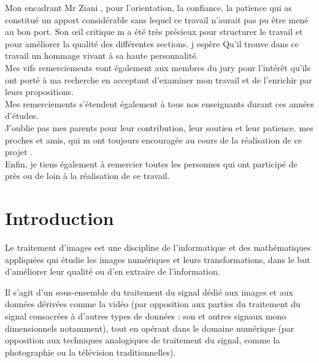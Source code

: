 \documentclass[a4paper,12pt]{report}
\begin{document}
Mon encadrant Mr Ziani , pour l’orientation, la confiance, la patience qui as constitué un apport considérable sans lequel ce travail n’aurait pas pu être mené au bon port.
Son œil critique m a été très précieux pour structurer le travail et pour améliorer la qualité des différentes sections. j espère Qu’il trouve dans ce travail un hommage vivant à sa haute personnalité.\\ 

Mes vifs remerciements vont également aux membres du jury pour l’intérêt qu’ils ont porté à ma recherche en acceptant d’examiner mon travail et de l’enrichir par leurs propositions.\\ 

Mes remerciements s’étendent également à tous nos enseignants durant ces années d'études.\\
J’oublie pas mes parents pour leur contribution, leur soutien et leur patience.  mes proches et amis, qui m ont toujours encouragée au cours de la réalisation de ce projet . \\ 

Enfin, je tiens également à remercier toutes les personnes qui ont participé de près ou de loin à la réalisation de ce travail.\\ 

 
 \newpage
 
\tableofcontents

\chapter*{Introduction}

Le traitement d'images est une discipline de l'informatique et des mathématiques appliquées qui étudie les images numériques et leurs transformations, dans le but d'améliorer leur qualité ou d'en extraire de l'information.

Il s'agit d'un sous-ensemble du traitement du signal dédié aux images et aux données dérivées comme la vidéo (par opposition aux parties du traitement du signal consacrées à d'autres types de données : son et autres signaux mono dimensionnels notamment), tout en opérant dans le domaine numérique (par opposition aux techniques analogiques de traitement du signal, comme la photographie ou la télévision traditionnelles).
\end{document}
